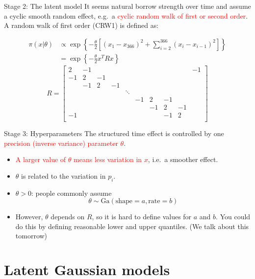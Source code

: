 \documentclass[
  ignorenonframetext,
]{beamer}
\providecommand{\tightlist}{%
  \setlength{\itemsep}{0pt}\setlength{\parskip}{0pt}}
\begin{document}
\begin{frame}{Stage 2: The latent model}
\protect\hypertarget{stage-2-the-latent-model}{}
It seems natural borrow strength over time and assume a cyclic smooth
random effect, e.g.~a
\textcolor{red}{cyclic random walk of first or second  order}. A random
walk of first order (CRW1) is defined as:

\[
\begin{aligned}
\pi(x|{\theta})  &\propto 
  \exp\left\{-\frac{\theta}{2}\left[(x_1-x_{366})^2 +
\sum_{i=2}^{366}(x_i-x_{i-1})^2 \right] \right\} \\
 & =  \exp\left\{-\frac{\theta}{2} x^{T}{R}x\right\}
\end{aligned}
\] \pause \scriptsize \[
R = \left[\begin{array}
{rrrrrrrrrr}
2 & -1 & & & &  & & & & -1\\
-1 & 2 & -1 & & & & & & \\
& -1 & 2 & -1 & & & & & \\
& & &  & \ddots & & &  & \\
& & & & & -1 & 2 & -1 &\\
& & & &  & & -1 & 2 & -1 \\
-1 & & & & & & & -1 & 2 \\
\end{array}
\right]
\] \normalsize
\end{frame}

\begin{frame}{Stage 3: Hyperparameters}
\protect\hypertarget{stage-3-hyperparameters}{}
The structured time effect is controlled by one
\textcolor{red}{precision (inverse variance) parameter $\theta$}.

\begin{itemize}
\tightlist
\item
  \textcolor{red}{A larger value of $\theta$ means less variation in $x$},
  i.e.~a smoother effect.
\item
  \(\theta\) is related to the variation in \(p_i\).
\item
  \(\theta > 0\): people commonly assume \[
  \theta \sim \text{Ga}(\text{shape} = a, \text{rate} = b)
  \]
\item
  However, \(\theta\) depends on \({R}\), so it is hard to define values
  for \(a\) and \(b\). You could do this by defining reasonable lower
  and upper quantiles. (We talk about this tomorrow)
\end{itemize}
\end{frame}

\hypertarget{latent-gaussian-models}{%
\section{Latent Gaussian models}\label{latent-gaussian-models}}
\end{document}
